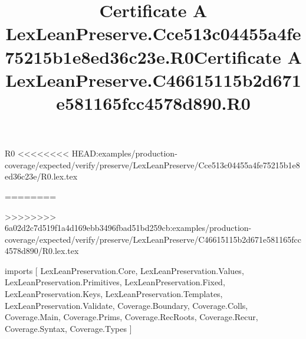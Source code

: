 \begin{lexlean}{R0}
<<<<<<<< HEAD:examples/production-coverage/expected/verify/preserve/LexLeanPreserve/Cce513c04455a4fe75215b1e8ed36c23e/R0.lex.tex
\title{Certificate A LexLeanPreserve.Cce513c04455a4fe75215b1e8ed36c23e.R0}
========
\title{Certificate A LexLeanPreserve.C46615115b2d671e581165fcc4578d890.R0}
>>>>>>>> 6a02d2c7d519f1a4d169ebb3496fbad51bd259cb:examples/production-coverage/expected/verify/preserve/LexLeanPreserve/C46615115b2d671e581165fcc4578d890/R0.lex.tex
\begin{coremodule}
imports [
  LexLeanPreservation.Core,
  LexLeanPreservation.Values,
  LexLeanPreservation.Primitives,
  LexLeanPreservation.Fixed,
  LexLeanPreservation.Keys,
  LexLeanPreservation.Templates,
  LexLeanPreservation.Validate,
  Coverage.Boundary,
  Coverage.Colls,
  Coverage.Main,
  Coverage.Prims,
  Coverage.RecRoots,
  Coverage.Recur,
  Coverage.Syntax,
  Coverage.Types
]


\end{coremodule}
\end{lexlean}
